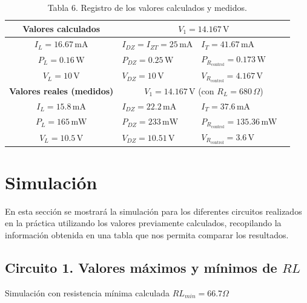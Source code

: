 \documentclass[journal]{IEEEtran}
\begin{document}
\begin{table}[H]
\centering
\begin{tabularx}{\columnwidth}{|c|X|X|X|}
\hline
\textbf{Valores calculados} & \multicolumn{3}{c|}{$V_1 = 14.167\,\text{V}$} \\ \hline

$I_L = 16.67\,\text{mA}$ 
& $I_{DZ} = I_{ZT} = 25\,\text{mA}$ 
& $I_T = 41.67\,\text{mA}$ 
& \\ \hline

$P_L = 0.16\,\text{W}$ 
& $P_{DZ} = 0.25\,\text{W}$ 
& $P_{R_{\text{control}}} = 0.173\,\text{W}$ 
& \\ \hline

$V_L = 10\,\text{V}$ 
& $V_{DZ} = 10\,\text{V}$ 
& $V_{R_{\text{control}}} = 4.167\,\text{V}$ 
& \\ \hline

\textbf{Valores reales (medidos)} 
& \multicolumn{3}{c|}{$V_1 = 14.167\,\text{V}$ (con $R_L = 680\,\Omega$)} \\ \hline

$I_L = 15.8\,\text{mA}$ 
& $I_{DZ} = 22.2\,\text{mA}$ 
& $I_T = 37.6\,\text{mA}$ 
& \\ \hline

$P_L = 165\,\text{mW}$ 
& $P_{DZ} = 233\,\text{mW}$ 
& $P_{R_{\text{control}}} = 135.36\,\text{mW}$ 
& \\ \hline

$V_L = 10.5\,\text{V}$ 
& $V_{DZ} = 10.51\,\text{V}$ 
& $V_{R_{\text{control}}} = 3.6\,\text{V}$ 
& \\ \hline

\end{tabularx}
\caption{Tabla 6. Registro de los valores calculados y medidos.}
\label{tablaFigura7}
\end{table}

\section{Simulación}

En esta sección se mostrará la simulación para los diferentes circuitos realizados en la práctica utilizando los valores previamente calculados, recopilando la información obtenida en una tabla que nos permita comparar los resultados.

\subsection{Circuito 1. Valores máximos y mínimos de $RL$}
Simulación con resistencia mínima calculada $RL_{min} = 66.7 \Omega$
\end{document}
